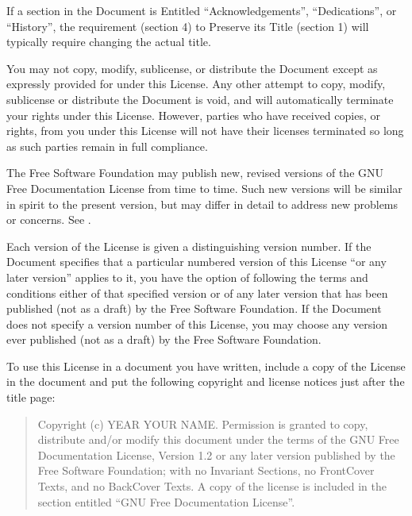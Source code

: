 \documentclass[letterpaper,10pt,english,openany,oneside]{sphinxmanual}
\begin{document}
\sphinxAtStartPar
If a section in the Document is Entitled “Acknowledgements”,
“Dedications”, or “History”, the requirement (section 4) to Preserve its
Title (section 1) will typically require changing the actual title.

\sphinxAtStartPar
{}

\sphinxAtStartPar
You may not copy, modify, sublicense, or distribute the Document except
as expressly provided for under this License. Any other attempt to copy,
modify, sublicense or distribute the Document is void, and will
automatically terminate your rights under this License. However, parties
who have received copies, or rights, from you under this License will
not have their licenses terminated so long as such parties remain in
full compliance.

\sphinxAtStartPar
{}

\sphinxAtStartPar
The Free Software Foundation may publish new, revised versions of the
GNU Free Documentation License from time to time. Such new versions will
be similar in spirit to the present version, but may differ in detail to
address new problems or concerns. See .

\sphinxAtStartPar
Each version of the License is given a distinguishing version number. If
the Document specifies that a particular numbered version of this
License “or any later version” applies to it, you have the option of
following the terms and conditions either of that specified version or
of any later version that has been published (not as a draft) by the
Free Software Foundation. If the Document does not specify a version
number of this License, you may choose any version ever published (not
as a draft) by the Free Software Foundation.

\sphinxAtStartPar
{}

\sphinxAtStartPar
To use this License in a document you have written, include a copy of
the License in the document and put the following copyright and license
notices just after the title page:
\begin{quote}

\sphinxAtStartPar
Copyright (c) YEAR YOUR NAME. Permission is granted to copy,
distribute and/or modify this document under the terms of the GNU
Free Documentation License, Version 1.2 or any later version
published by the Free Software Foundation; with no Invariant
Sections, no Front\sphinxhyphen{}Cover Texts, and no Back\sphinxhyphen{}Cover Texts. A copy of
the license is included in the section entitled “GNU Free
Documentation License”.
\end{quote}
\end{document}
